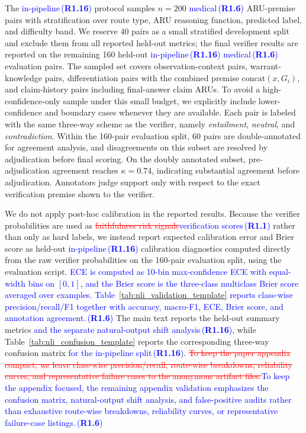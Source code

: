 \documentclass[a4paper,fleqn,doubleblind]{cas-sc}
\DeclareRobustCommand{\deleted}[1]{\textcolor{red}{\sout{#1}}}
\DeclareRobustCommand{\added}[1]{\textcolor{blue}{#1}}
\DeclareRobustCommand{\revtag}[1]{\textcolor{blue}{\scriptsize\,(\textbf{#1})}}
\begin{document}
The \added{in-pipeline}\revtag{R1.16} protocol samples $n=200$ \added{medical}\revtag{R1.6} ARU-premise pairs with stratification over route type, ARU reasoning function, predicted label, and difficulty band. We reserve 40 pairs as a small stratified development split and exclude them from all reported held-out metrics; the final verifier results are reported on the remaining 160 held-out \added{in-pipeline}\revtag{R1.16} \added{medical}\revtag{R1.6} evaluation pairs. The sampled set covers observation-context pairs, warrant-knowledge pairs, differentiation pairs with the combined premise $\mathrm{concat}(x, G_i)$, and claim-history pairs including final-answer claim ARUs. To avoid a high-confidence-only sample under this small budget, we explicitly include lower-confidence and boundary cases whenever they are available. Each pair is labeled with the same three-way scheme as the verifier, namely \textit{entailment}, \textit{neutral}, and \textit{contradiction}. Within the 160-pair evaluation split, 60 pairs are double-annotated for agreement analysis, and disagreements on this subset are resolved by adjudication before final scoring. On the doubly annotated subset, pre-adjudication agreement reaches $\kappa=0.74$, indicating substantial agreement before adjudication. Annotators judge support only with respect to the exact verification premise shown to the verifier.

We do not apply post-hoc calibration in the reported results. Because the verifier probabilities are used as \deleted{faithfulness risk signals}\added{verification scores}\revtag{R1.1} rather than only as hard labels, we instead report expected calibration error and Brier score as held-out \added{in-pipeline}\revtag{R1.16} calibration diagnostics computed directly from the raw verifier probabilities on the 160-pair evaluation split, using the evaluation script. \added{ECE is computed as 10-bin max-confidence ECE with equal-width bins on $[0,1]$, and the Brier score is the three-class multiclass Brier score averaged over examples. Table~\ref{tab:nli_validation_template} reports class-wise precision/recall/F1 together with accuracy, macro-F1, ECE, Brier score, and annotation agreement.}\revtag{R1.6} The main text reports the held-out summary metrics \added{and the separate natural-output shift analysis}\revtag{R1.16}, while Table~\ref{tab:nli_confusion_template} reports the corresponding three-way confusion matrix \added{for the in-pipeline split}\revtag{R1.16}. \deleted{To keep the paper appendix compact, we leave class-wise precision/recall, route-wise breakdowns, reliability curves, and representative failure cases to the anonymous artifact files.}\added{To keep the appendix focused, the remaining appendix validation emphasizes the confusion matrix, natural-output shift analysis, and false-positive audits rather than exhaustive route-wise breakdowns, reliability curves, or representative failure-case listings.}\revtag{R1.6}
\end{document}

